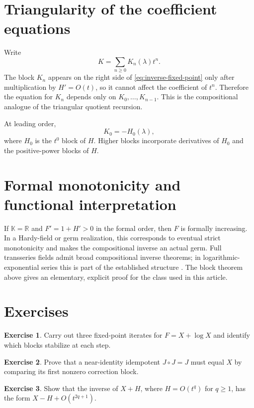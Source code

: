 \documentclass[11pt,openany]{book}
\theoremstyle{definition}
\newtheorem{exercise}{Exercise}[chapter]
\theoremstyle{plain}
\theoremstyle{remark}
\newcommand{\R}{\mathbb{R}}
\newcommand{\K}{\mathbb{K}}
\begin{document}
\section{Triangularity of the coefficient equations}
Write
\[
 K=\sum_{n\ge0}K_n(\lambda)t^n.
\]
The block \(K_n\) appears on the right side of \cref{eq:inverse-fixed-point} only after multiplication by \(H'=O(t)\), so it cannot affect the coefficient of \(t^n\). Therefore the equation for \(K_n\) depends only on \(K_0,\ldots,K_{n-1}\). This is the compositional analogue of the triangular quotient recursion.

At leading order,
\begin{equation}\label{eq:inverse-leading-correction}
 K_0=-H_0(\lambda),
\end{equation}
where \(H_0\) is the \(t^0\) block of \(H\). Higher blocks incorporate derivatives of \(H_0\) and the positive-power blocks of \(H\).

\section{Formal monotonicity and functional interpretation}
If \(\K=\R\) and \(F'=1+H'>0\) in the formal order, then \(F\) is formally increasing. In a Hardy-field or germ realization, this corresponds to eventual strict monotonicity and makes the compositional inverse an actual germ. Full transseries fields admit broad compositional inverse theorems; in logarithmic-exponential series this is part of the established structure \cite{vdDMM-2001,adh-book}. The block theorem above gives an elementary, explicit proof for the class used in this article.

\section{Exercises}
\begin{exercise}
Carry out three fixed-point iterates for \(F=X+\log X\) and identify which blocks stabilize at each step.
\end{exercise}
\begin{exercise}
Prove that a near-identity idempotent \(J\circ J=J\) must equal \(X\) by comparing its first nonzero correction block.
\end{exercise}
\begin{exercise}
Show that the inverse of \(X+H\), where \(H=O(t^q)\) for \(q\ge1\), has the form \(X-H+O(t^{2q+1})\).
\end{exercise}
\end{document}
